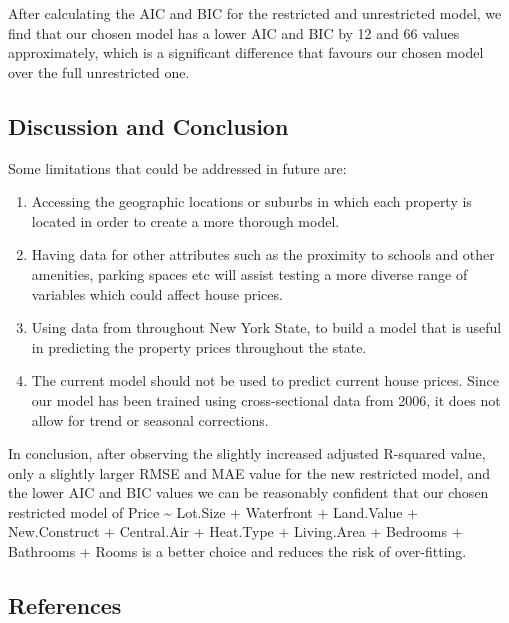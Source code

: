 \documentclass[letterpaper,9pt,twocolumn,twoside,]{pinp}
\providecommand{\tightlist}{%
  \setlength{\itemsep}{0pt}\setlength{\parskip}{0pt}}
\begin{document}
After calculating the AIC and BIC for the restricted and unrestricted
model, we find that our chosen model has a lower AIC and BIC by 12 and
66 values approximately, which is a significant difference that favours
our chosen model over the full unrestricted one.

\hypertarget{discussion-and-conclusion}{%
\subsection{\texorpdfstring{\textbf{Discussion and
Conclusion}}{Discussion and Conclusion}}\label{discussion-and-conclusion}}

Some limitations that could be addressed in future are:

\begin{enumerate}
\def\labelenumi{\arabic{enumi}.}
\tightlist
\item
  Accessing the geographic locations or suburbs in which each property
  is located in order to create a more thorough model.
\item
  Having data for other attributes such as the proximity to schools and
  other amenities, parking spaces etc will assist testing a more diverse
  range of variables which could affect house prices.
\item
  Using data from throughout New York State, to build a model that is
  useful in predicting the property prices throughout the state.
\item
  The current model should not be used to predict current house prices.
  Since our model has been trained using cross-sectional data from 2006,
  it does not allow for trend or seasonal corrections.
\end{enumerate}

In conclusion, after observing the slightly increased adjusted R-squared
value, only a slightly larger RMSE and MAE value for the new restricted
model, and the lower AIC and BIC values we can be reasonably confident
that our chosen restricted model of Price \textasciitilde{} Lot.Size +
Waterfront + Land.Value + New.Construct + Central.Air + Heat.Type +
Living.Area + Bedrooms + Bathrooms + Rooms is a better choice and
reduces the risk of over-fitting.

\hypertarget{references}{%
\subsection{\texorpdfstring{\textbf{References}}{References}}\label{references}}
\end{document}
